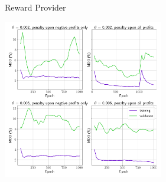\begin{frame}{Reward Provider}
\begin{center}
      \includegraphics[height=7cm]{images/penalty_negtive_profits_compare.png}
\end{center}
\end{frame}

